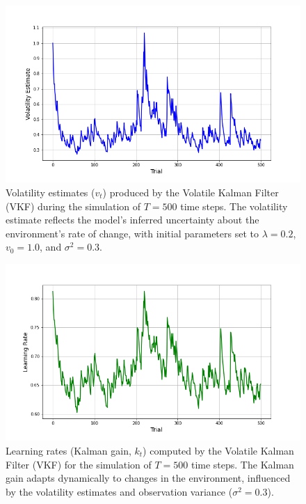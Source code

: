 \documentclass[12pt]{article}
\theoremstyle{definition}
\begin{document}
\begin{figure}[H]
    \centering
    \includegraphics[scale=0.5]{../Figures/exp1_vol.png}
    \caption{Volatility estimates ($v_t$) produced by the Volatile Kalman Filter (VKF) during the simulation of $T = 500$ time steps. The volatility estimate reflects the model's inferred uncertainty about the environment's rate of change, with initial parameters set to $\lambda = 0.2$, $v_0 = 1.0$, and $\sigma^2 = 0.3$.
    }
    \label{fig:vol_1}
\end{figure}

\begin{figure}[H]
    \centering
    \includegraphics[scale=0.5]{../Figures/exp1_lr.png}
    \caption{Learning rates (Kalman gain, $k_t$) computed by the Volatile Kalman Filter (VKF) for the simulation of $T = 500$ time steps. The Kalman gain adapts dynamically to changes in the environment, influenced by the volatility estimates and observation variance ($\sigma^2 = 0.3$).
    }
    \label{fig:lr_1}

\end{figure}
\end{document}
